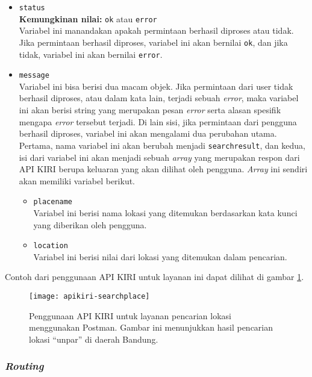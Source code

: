 \begin{itemize}
	\item \verb|status|\\
	\textbf{Kemungkinan nilai:} \verb|ok| atau \verb|error|\\
	Variabel ini manandakan apakah permintaan berhasil diproses atau tidak. Jika permintaan berhasil diproses, variabel ini akan bernilai \verb|ok|, dan jika tidak, variabel ini akan bernilai \verb|error|.
	\item \verb|message|\\
	Variabel ini bisa berisi dua macam objek. Jika permintaan dari user tidak berhasil diproses, atau dalam kata lain, terjadi sebuah \textit{error}, maka variabel ini akan berisi string yang merupakan pesan \textit{error} serta alasan spesifik mengapa \textit{error} tersebut terjadi. Di lain sisi, jika permintaan dari pengguna berhasil diproses, variabel ini akan mengalami dua perubahan utama. Pertama, nama variabel ini akan berubah menjadi \verb|searchresult|, dan kedua, isi dari variabel ini akan menjadi sebuah \textit{array} yang merupakan respon dari API KIRI berupa keluaran yang akan dilihat oleh pengguna. \textit{Array} ini sendiri akan memiliki variabel berikut.
	
	\begin{itemize}
		\item \verb|placename|\\
		Variabel ini berisi nama lokasi yang ditemukan berdasarkan kata kunci yang diberikan oleh pengguna.
		\item \verb|location|\\
		Variabel ini berisi nilai \latlon dari lokasi yang ditemukan dalam pencarian.
	\end{itemize}
	
\end{itemize}
\vspace{\baselineskip}\noindent
Contoh dari penggunaan API KIRI untuk layanan ini dapat dilihat di gambar \ref{fig:kiri-api-searchplace-usage}.

\begin{figure}[t]
    \centering
    \texttt{[image: apikiri-searchplace]}
    \caption[Penggunaan API KIRI untuk layanan pencarian lokasi]{Penggunaan API KIRI untuk layanan pencarian lokasi menggunakan Postman. Gambar ini menunjukkan hasil pencarian lokasi ``unpar'' di daerah Bandung.}
    \label{fig:kiri-api-searchplace-usage}
\end{figure}

\subsubsection{\textit{Routing}}
\label{sec:kiri-api-routing}

